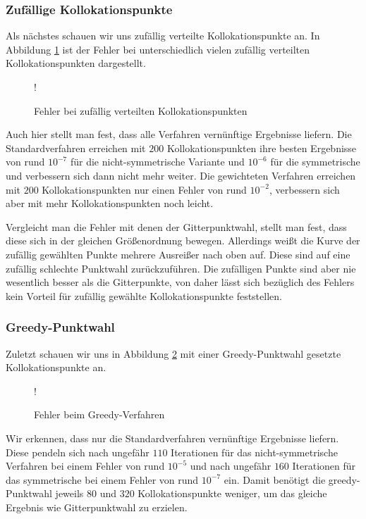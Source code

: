 \subsubsection{Zufällige Kollokationspunkte}
Als nächstes schauen wir uns zufällig verteilte Kollokationspunkte an. In Abbildung \ref{fig:error-random} ist der Fehler bei unterschiedlich vielen zufällig verteilten Kollokationspunkten dargestellt.
\begin{figure}[ht]
\centering
\resizebox {\columnwidth} {!} {

}
\caption{Fehler bei zufällig verteilten Kollokationspunkten}
\label{fig:error-random}
\end{figure}

Auch hier stellt man fest, dass alle Verfahren vernünftige Ergebnisse liefern. Die Standardverfahren erreichen mit $200$ Kollokationspunkten ihre besten Ergebnisse von rund $10^{-7}$ für die nicht-symmetrische Variante und $10^{-6}$ für die symmetrische und verbessern sich dann nicht mehr weiter. Die gewichteten Verfahren erreichen mit $200$ Kollokationspunkten nur einen Fehler von rund $10^{-2}$, verbessern sich aber mit mehr Kollokationspunkten noch leicht.

Vergleicht man die Fehler mit denen der Gitterpunktwahl, stellt man fest, dass diese sich in der gleichen Größenordnung bewegen. Allerdings weißt die Kurve der zufällig gewählten Punkte mehrere Ausreißer nach oben auf. Diese sind auf eine zufällig schlechte Punktwahl zurückzuführen. Die zufälligen Punkte sind aber nie wesentlich besser als die Gitterpunkte, von daher lässt sich bezüglich des Fehlers kein Vorteil für zufällig gewählte Kollokationspunkte feststellen.

\subsubsection{Greedy-Punktwahl}
Zuletzt schauen wir uns in Abbildung \ref{fig:error-greedy} mit einer Greedy-Punktwahl gesetzte Kollokationspunkte an.
\begin{figure}[ht]
\centering
\resizebox {\columnwidth} {!} {

}
\caption{Fehler beim Greedy-Verfahren}
\label{fig:error-greedy}
\end{figure}

Wir erkennen, dass nur die Standardverfahren vernünftige Ergebnisse liefern. Diese pendeln sich nach ungefähr $110$ Iterationen für das nicht-symmetrische Verfahren bei einem Fehler von rund $10^{-5}$ und nach ungefähr $160$ Iterationen für das symmetrische bei einem Fehler von rund $10^{-7}$ ein. Damit benötigt die greedy-Punktwahl jeweils $80$ und $320$ Kollokationspunkte weniger, um das gleiche Ergebnis wie Gitterpunktwahl zu erzielen.

